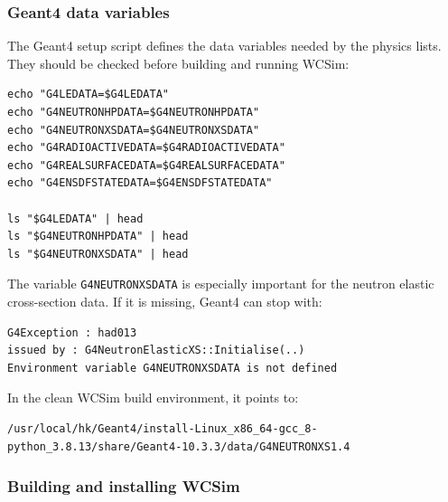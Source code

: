 \documentclass{article}
\numberwithin{table}{subsection}
\numberwithin{figure}{subsection}
\numberwithin{equation}{subsection}
\numberwithin{footnote}{subsection}
\begin{document}
\subsubsection{Geant4 data variables}
\label{subsec:wcsim_geant4_data}

The Geant4 setup script defines the data variables needed by the physics lists. They should be checked before building and running WCSim:
\begin{lstlisting}[style=terminal]
echo "G4LEDATA=$G4LEDATA"
echo "G4NEUTRONHPDATA=$G4NEUTRONHPDATA"
echo "G4NEUTRONXSDATA=$G4NEUTRONXSDATA"
echo "G4RADIOACTIVEDATA=$G4RADIOACTIVEDATA"
echo "G4REALSURFACEDATA=$G4REALSURFACEDATA"
echo "G4ENSDFSTATEDATA=$G4ENSDFSTATEDATA"

ls "$G4LEDATA" | head
ls "$G4NEUTRONHPDATA" | head
ls "$G4NEUTRONXSDATA" | head
\end{lstlisting}
The variable \texttt{G4NEUTRONXSDATA} is especially important for the neutron elastic cross-section data. If it is missing, Geant4 can stop with:
\begin{lstlisting}[style=terminal]
G4Exception : had013
issued by : G4NeutronElasticXS::Initialise(..)
Environment variable G4NEUTRONXSDATA is not defined
\end{lstlisting}
In the clean WCSim build environment, it points to:
\begin{lstlisting}[style=terminal]
/usr/local/hk/Geant4/install-Linux_x86_64-gcc_8-python_3.8.13/share/Geant4-10.3.3/data/G4NEUTRONXS1.4
\end{lstlisting}

\subsubsection{Building and installing WCSim}
\label{subsec:wcsim_build_install}
\end{document}
